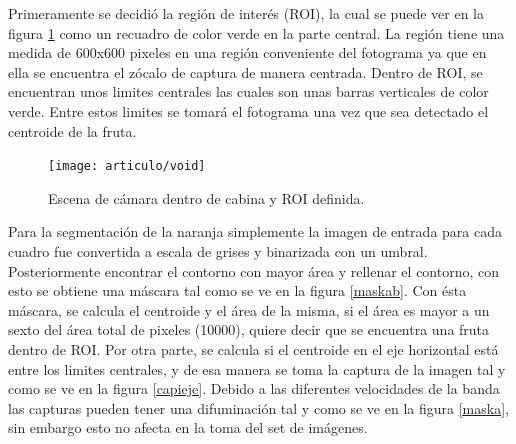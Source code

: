\documentclass[twoside,spanish,ESP,MSc]{plantillaLabUPV}
\theoremstyle{definition}
\begin{document}
Primeramente se decidió la región de interés (ROI), la cual se puede ver en la figura \ref{fig:void} como un recuadro de color verde en la parte central. La región tiene una medida de 600x600 pixeles en una región conveniente del fotograma ya que en ella se encuentra el zócalo de captura de manera centrada. Dentro de ROI, se encuentran unos limites centrales las cuales son unas barras verticales de color verde. Entre estos limites se tomará el fotograma una vez que sea detectado el centroide de la fruta.

\begin{figure}
	\centering
	\texttt{[image: articulo/void]}
	\caption{Escena de cámara dentro de cabina y ROI definida.}
	\label{fig:void}
\end{figure}

Para la segmentación de la naranja simplemente la imagen de entrada para cada cuadro fue convertida a escala de grises y binarizada con un umbral. Posteriormente encontrar el contorno con mayor área y rellenar el contorno, con esto se obtiene una máscara tal como se ve en la figura \ref{maskab}. Con ésta máscara, se calcula el centroide y el área de la misma, si el área es mayor a un sexto del área total de pixeles (10000), quiere decir que se encuentra una fruta dentro de ROI. Por otra parte, se calcula si el centroide en el eje horizontal está entre los limites centrales, y de esa manera se toma la captura de la imagen tal y como se ve en la figura \ref{capieje}. Debido a las diferentes velocidades de la banda las capturas pueden tener una difuminación tal y como se ve en la figura \ref{maska}, sin embargo esto no afecta en la toma del set de imágenes.
\end{document}
